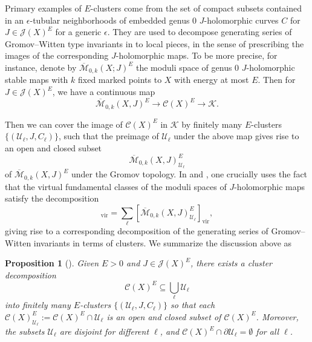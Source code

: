 \documentclass[reqno]{amsart}
\numberwithin{equation}{section}
\numberwithin{equation}{section}
\numberwithin{equation}{section}
\newtheorem{prop}[thm]{Proposition}
\theoremstyle{definition}
\theoremstyle{remark}
\theoremstyle{remark}
\newcommand{\ov}{\overline}
\begin{document}
Primary examples of $E$-clusters come from the set of compact subsets contained in an $\epsilon$-tubular neighborhoods of embedded genus $0$ $J$-holomorphic curves $C$ for $J \in \mathcal{J}(X)^E$ for a generic $\epsilon$. They are used to decompose generating series of Gromov--Witten type invariants in to local pieces, in the sense of prescribing the images of the corresponding $J$-holomorphic maps. To be more precise, for instance, denote by $\ov{\mathcal{M}}_{0,k}(X;J)^E$ the moduli space of genus $0$ $J$-holomorphic stable maps with $k$ fixed marked points to $X$ with energy at most $E$. Then for $J \in \mathcal{J}(X)^E$, we have a continuous map
\begin{equation}
    \ov{\mathcal{M}}_{0,k}(X,J)^E \to \mathcal{C}(X)^E \to \mathcal{K}.
\end{equation}

Then we can cover the image of $\mathcal{C}(X)^E$ in $\mathcal{K}$ by finitely many $E$-clusters $\{ (\mathcal{U}_\ell, J, C_\ell) \}$, such that the preimage of $\mathcal{U}_\ell$ under the above map gives rise to an open and closed subset
\begin{equation}
    \ov{\mathcal{M}}_{0,k}(X,J)^E_{\mathcal{U}_\ell}
\end{equation}
of $\ov{\mathcal{M}}_{0,k}(X,J)^E$ under the Gromov topology. In \cite{IP-GV} and \cite{doan2021gopakumar}, one crucially uses the fact that the virtual fundamental classes of the moduli spaces of $J$-holomorphic maps satisfy the decomposition
\begin{equation}
    [\ov{\mathcal{M}}_{0,k}(X,J)^E]_{\mathrm{vir}} = \sum_\ell [\ov{\mathcal{M}}_{0,k}(X,J)^E_{\mathcal{U}_\ell}]_{\mathrm{vir}},
\end{equation}
giving rise to a corresponding decomposition of the generating series of Gromov--Witten invariants in terms of clusters. We summarize the discussion above as

\begin{prop}[{\cite[Lemma 1.6, Lemma 2.3, Proposition 2.4]{IP-GV}}]
    Given $E>0$ and $J \in \mathcal{J}(X)^E$, there exists a cluster decomposition
    \begin{equation}
        \mathcal{C}(X)^E \subseteq \bigcup_{\ell} \mathcal{U}_\ell
    \end{equation}
    into finitely many $E$-clusters $\{(\mathcal{U}_\ell, J, C_\ell)\}$ so that each $\mathcal{C}(X)^E_{\mathcal{U}_\ell} := \mathcal{C}(X)^E \cap \mathcal{U}_\ell$ is an open and closed subset of $\mathcal{C}(X)^E$. Moreover, the subsets $\mathcal{U}_\ell$ are disjoint for different $\ell$, and $\mathcal{C}(X)^E \cap \partial \mathcal{U}_\ell = \emptyset$ for all $\ell$.
\end{prop}
\end{document}
